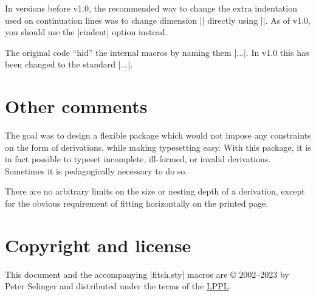 \documentclass{ltxdoc}
\newcommand\NewIn[1]{\leavevmode
  \marginpar{\hfill\fbox{\fbox{New in #1}}\hspace*{1em}}\ignorespaces}
\begin{document}
\NewIn{1.0}\DescribeMacro{\ndindent} In versions before v1.0, the recommended way
to change the extra indentation used on continuation lines was to
change dimension |\ndindent| directly using |\setlength|. As of v1.0,
you should use the |cindent| option instead.

The original code ``hid'' the internal macros by naming
them |\nd*...|. In v1.0 this has been changed to the standard
|\nd@...|.

\section{Other comments}

The goal was to design a flexible package which would not impose any
constraints on the form of derivations, while making typesetting easy.
With this package, it is in fact possible to typeset incomplete,
ill-formed, or invalid derivations. Sometimes it is pedagogically necessary
to do so.

There are no arbitrary limits on the size or nesting depth of a derivation,
except for the obvious requirement of fitting horizontally on the
printed page.

\section{Copyright and license}

This document and the accompanying |fitch.sty| macros
are {\copyright} 2002--2023 by Peter Selinger and distributed under
the terms of the \href{https://www.latex-project.org/lppl/}{LPPL}.
\end{document}
